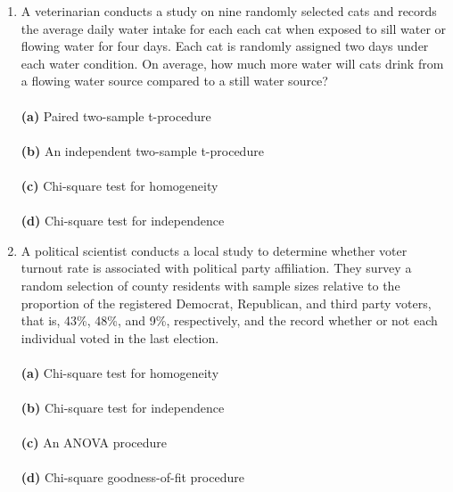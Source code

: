 \documentclass[12pt]{article}
\begin{document}
\begin{enumerate}[leftmargin=\labelsep]
\item A veterinarian conducts a study on nine randomly selected cats and records the average daily water intake for each each cat when exposed to sill water or flowing water for four days. Each cat is randomly assigned two days under each water condition. On average, how much more water will cats drink from a flowing water source compared to a still water source?\\ \vspace{1mm}\\
{\bf (a)} \hspace{2mm} Paired two-sample t-procedure\\ \vspace{1mm}\\
{\bf (b)} \hspace{2mm} An independent two-sample t-procedure\\   \vspace{1mm}\\
{\bf (c)} \hspace{2mm} Chi-square test for homogeneity\\  \vspace{1mm}\\
{\bf (d)} \hspace{2mm} Chi-square test for independence\\

\item A political scientist conducts a local study to determine whether voter turnout rate is associated with political party affiliation. They survey a random selection of county residents with sample sizes relative to the proportion of the registered Democrat, Republican, and third party voters, that is, 43\%, 48\%, and 9\%, respectively, and the record whether or not each individual voted in the last election.\\ \vspace{1mm}\\
{\bf (a)} \hspace{2mm} Chi-square test for homogeneity\\ \vspace{1mm}\\
{\bf (b)} \hspace{2mm} Chi-square test for independence\\   \vspace{1mm}\\
{\bf (c)} \hspace{2mm} An ANOVA procedure\\  \vspace{1mm}\\
{\bf (d)} \hspace{2mm} Chi-square goodness-of-fit procedure\\



\end{enumerate}
\end{document}
